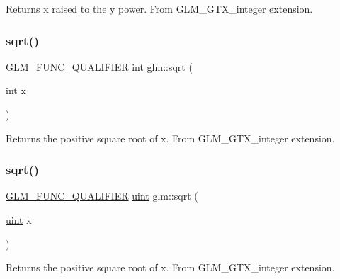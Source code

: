 Returns x raised to the y power. From G\+L\+M\+\_\+\+G\+T\+X\+\_\+integer extension. \mbox{\label{group__gtx__integer_ga78e2e68330e91d350fcfc2f4831cad12}} 
\subsubsection{\texorpdfstring{sqrt()}{sqrt()}\hspace{0.1cm}{\footnotesize\ttfamily [1/2]}}
{\footnotesize\ttfamily \mbox{\hyperlink{setup_8hpp_a33fdea6f91c5f834105f7415e2a64407}{G\+L\+M\+\_\+\+F\+U\+N\+C\+\_\+\+Q\+U\+A\+L\+I\+F\+I\+ER}} int glm\+::sqrt (\begin{DoxyParamCaption}\item[{int}]{x }\end{DoxyParamCaption})}

Returns the positive square root of x. From G\+L\+M\+\_\+\+G\+T\+X\+\_\+integer extension. \mbox{\label{group__gtx__integer_ga457e9efca8339bf918d319e9c55f7c8f}} 
\subsubsection{\texorpdfstring{sqrt()}{sqrt()}\hspace{0.1cm}{\footnotesize\ttfamily [2/2]}}
{\footnotesize\ttfamily \mbox{\hyperlink{setup_8hpp_a33fdea6f91c5f834105f7415e2a64407}{G\+L\+M\+\_\+\+F\+U\+N\+C\+\_\+\+Q\+U\+A\+L\+I\+F\+I\+ER}} \mbox{\hyperlink{group__core__precision_ga4fd29415871152bfb5abd588334147c8}{uint}} glm\+::sqrt (\begin{DoxyParamCaption}\item[{\mbox{\hyperlink{group__core__precision_ga4fd29415871152bfb5abd588334147c8}{uint}}}]{x }\end{DoxyParamCaption})}

Returns the positive square root of x. From G\+L\+M\+\_\+\+G\+T\+X\+\_\+integer extension. 